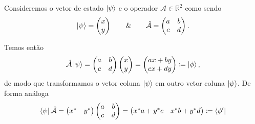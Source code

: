     \begin{example}\label{example 1.5}
        Consideremos o vetor de estado $\ket{\psi}$ e o operador $\hat{\mathcal{A}}\in\mathbb{R}^2$ como sendo
            \begin{equation*}
                \ket{\psi} = \begin{pmatrix}
                    x \\ y
                \end{pmatrix} \qquad \& \qquad 
                \hat{\mathcal{A}} = \begin{pmatrix}
                    a & b \\ c & d
                \end{pmatrix}.
            \end{equation*}
        
        Temos então
            \begin{equation*}
                \hat{\mathcal{A}}\ket{\psi} = 
                    \begin{pmatrix}
                        a & b \\ c & d
                    \end{pmatrix}
                    \begin{pmatrix}
                        x \\ y
                    \end{pmatrix} = 
                    \begin{pmatrix}
                        ax + by \\ cx + dy
                    \end{pmatrix} \coloneqq \ket{\phi},
            \end{equation*}
        de modo que transformamos o vetor coluna $\ket{\psi}$ em outro vetor coluna $\ket{\psi}$. De forma análoga
            \begin{equation*}
                \bra{\psi}\hat{\mathcal{A}} = 
                \begin{pmatrix}
                    x^{\ast} & y^{\ast}
                \end{pmatrix}
                \begin{pmatrix}
                    a & b \\ c & d
                \end{pmatrix} = 
                \begin{pmatrix}
                    x^{\ast}a + y^{\ast}c & x^{\ast}b + y^{\ast}d    
                \end{pmatrix} \coloneqq \bra{\phi'}

\end{equation*}
\end{example}
